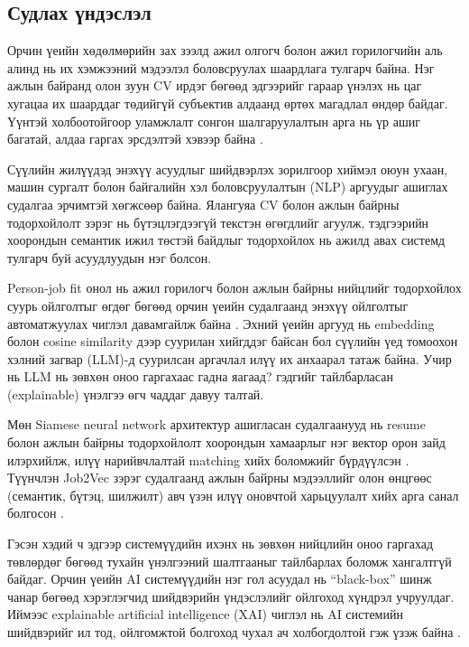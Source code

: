 \subsection*{Судлах үндэслэл}

Орчин үеийн хөдөлмөрийн зах зээлд ажил олгогч болон ажил горилогчийн аль алинд нь их хэмжээний мэдээлэл боловсруулах шаардлага тулгарч байна. Нэг ажлын байранд олон зуун CV ирдэг бөгөөд эдгээрийг гараар үнэлэх нь цаг хугацаа их шаарддаг төдийгүй субъектив алдаанд өртөх магадлал өндөр байдаг. Үүнтэй холбоотойгоор уламжлалт сонгон шалгаруулалтын арга нь үр ашиг багатай, алдаа гаргах эрсдэлтэй хэвээр байна \cite{smart_hiring_ai} .

Сүүлийн жилүүдэд энэхүү асуудлыг шийдвэрлэх зорилгоор хиймэл оюун ухаан, машин сургалт болон байгалийн хэл боловсруулалтын (NLP) аргуудыг ашиглах судалгаа эрчимтэй хөгжсөөр байна. Ялангуяа CV болон ажлын байрны тодорхойлолт зэрэг нь бүтэцлэгдээгүй текстэн өгөгдлийг агуулж, тэдгээрийн хоорондын семантик ижил төстэй байдлыг тодорхойлох нь ажилд авах системд тулгарч буй асуудлуудын нэг болсон.

Person-job fit онол нь ажил горилогч болон ажлын байрны нийцлийг тодорхойлох суурь ойлголтыг өгдөг бөгөөд орчин үеийн судалгаанд энэхүү ойлголтыг автоматжуулах чиглэл давамгайлж байна \cite{kristof2005personjob}. Эхний үеийн аргууд нь embedding болон cosine similarity дээр суурилан хийгддэг байсан бол сүүлийн үед томоохон хэлний загвар (LLM)-д суурилсан аргачлал илүү их анхаарал татаж байна. Учир нь LLM нь зөвхөн оноо гаргахаас гадна яагаад? гэдгийг тайлбарласан (explainable) үнэлгээ өгч чаддаг давуу талтай.

Мөн Siamese neural network архитектур ашигласан судалгаанууд нь resume болон ажлын байрны тодорхойлолт хоорондын хамаарлыг нэг вектор орон зайд илэрхийлж, илүү нарийвчлалтай matching хийх боломжийг бүрдүүлсэн \cite{resume_matching_siamese}. Түүнчлэн Job2Vec зэрэг судалгаанд ажлын байрны мэдээллийг олон өнцгөөс (семантик, бүтэц, шилжилт) авч үзэн илүү оновчтой харьцуулалт хийх арга санал болгосон \cite{maheshwary2018job}.

Гэсэн хэдий ч эдгээр системүүдийн ихэнх нь зөвхөн нийцлийн оноо гаргахад төвлөрдөг бөгөөд тухайн үнэлгээний шалтгааныг тайлбарлах боломж хангалтгүй байдаг. Орчин үеийн AI системүүдийн нэг гол асуудал нь “black-box” шинж чанар бөгөөд хэрэглэгчид шийдвэрийн үндэслэлийг ойлгоход хүндрэл учруулдаг. Иймээс explainable artificial intelligence (XAI) чиглэл нь AI системийн шийдвэрийг ил тод, ойлгомжтой болгоход чухал ач холбогдолтой гэж үзэж байна \cite{arrieta2020xai,adadi2018xai}.

